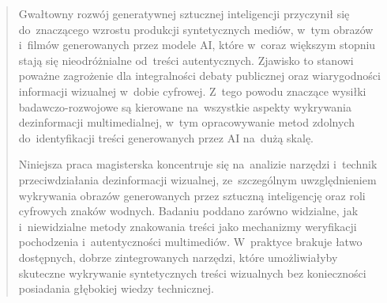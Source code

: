 \documentclass[pl,12pt,openany]{TAGH/t_agh_av}
\begin{document}

\begin{abstract}
Gwa\l{}towny rozw\'{o}j generatywnej sztucznej inteligencji przyczyni\l{} si\k{e} do~znacz\k{a}cego
wzrostu produkcji syntetycznych medi\'{o}w, w~tym obraz\'{o}w i~film\'{o}w generowanych przez
modele AI, które w~coraz wi\k{e}kszym stopniu staj\k{a} si\k{e} nieodróżnialne od~tre\'{s}ci
autentycznych. Zjawisko to stanowi powa\.{z}ne zagro\.{z}enie dla integralno\'{s}ci debaty
publicznej oraz wiarygodno\'{s}ci informacji wizualnej w~dobie cyfrowej. Z~tego powodu
znacz\k{a}ce wysi\l{}ki badawczo-rozwojowe s\k{a} kierowane na~wszystkie aspekty wykrywania
dezinformacji multimedialnej, w~tym opracowywanie metod zdolnych do~identyfikacji
tre\'{s}ci generowanych przez AI na~du\.{z}\k{a} skal\k{e}.

Niniejsza praca magisterska koncentruje si\k{e} na~analizie narz\k{e}dzi i~technik
przeciwdzia\l{}ania dezinformacji wizualnej, ze~szczeg\'{o}lnym uwzgl\k{e}dnieniem
wykrywania obraz\'{o}w generowanych przez sztuczn\k{a} inteligencj\k{e} oraz roli
cyfrowych znak\'{o}w wodnych. Badaniu poddano zar\'{o}wno widzialne, jak i~niewidzialne
metody znakowania tre\'{s}ci jako mechanizmy weryfikacji pochodzenia i~autentyczno\'{s}ci
multimedi\'{o}w. W~praktyce brakuje \l{}atwo dost\k{e}pnych, dobrze zintegrowanych
narz\k{e}dzi, kt\'{o}re umo\.{z}liwia\l{}yby skuteczne wykrywanie syntetycznych tre\'{s}ci
wizualnych bez konieczno\'{s}ci posiadania g\l{}\k{e}bokiej wiedzy technicznej.


\end{abstract}
\end{document}
